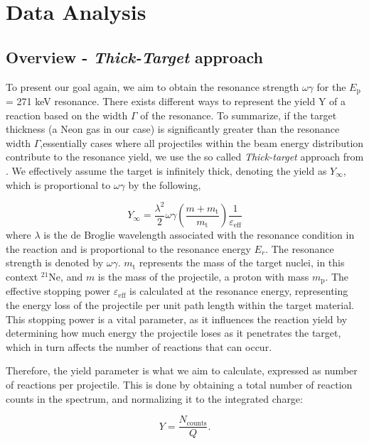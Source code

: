 \documentclass[a4paper,12pt]{article}
\begin{document}
\section{Data Analysis}\label{data}
\subsection{Overview - {\textit{Thick-Target}} approach}\label{approach}

To present our goal again, we aim to obtain the resonance strength $\omega\gamma$ for the $E_{\text{p}}$ = 271 keV resonance.  There exists different ways to represent the yield Y of a reaction based on the width $\Gamma$ of the resonance.  To summarize, if the target thickness (a Neon gas in our case) is significantly greater than the resonance width $\Gamma$,essentially cases where all projectiles within the beam energy distribution contribute to the resonance yield, we use the so called \textit{Thick-target} approach from \cite{RolfsRodney1988}.  We effectively assume the target is infinitely thick, denoting the yield as $Y_{\infty}$, which is proportional to $\omega\gamma$ by the following, 

\begin{equation}
Y_{\infty} = \frac{\lambda^2}{2} \omega\gamma \left( \frac{m + m_{\text{t}}}{m_{\text{t}}} \right) \frac{1}{\varepsilon_{\text{eff}}}
\end{equation}
where \( \lambda \) is the de Broglie wavelength associated with the resonance condition in the reaction and is proportional to the resonance energy \( E_r \). The resonance strength is denoted by \( \omega\gamma \). \( m_{\text{t}} \) represents the mass of the target nuclei, in this context \( ^{21}\text{Ne} \), and \( m \) is the mass of the projectile, a proton with mass \( m_{\text{p}} \). The effective stopping power \( \varepsilon_{\text{eff}} \) is calculated at the resonance energy, representing the energy loss of the projectile per unit path length within the target material. This stopping power is a vital parameter, as it influences the reaction yield by determining how much energy the projectile loses as it penetrates the target, which in turn affects the number of reactions that can occur.

Therefore, the yield parameter is what we aim to calculate, expressed as number of reactions per projectile.  This is done by obtaining a total number of reaction counts in the spectrum, and normalizing it to the integrated charge:

\begin{equation}
    Y = \frac{N_{\text{counts}}}{Q}.
\end{equation}
\end{document}
